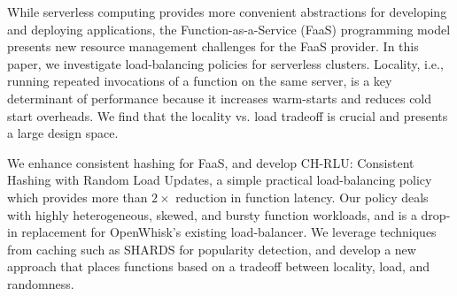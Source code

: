While serverless computing provides more convenient abstractions for developing and deploying applications, the Function-as-a-Service (FaaS) programming model presents new resource management challenges for the FaaS provider. 
In this paper, we investigate load-balancing policies for serverless clusters.
Locality, i.e., running repeated invocations of a function on the same server, is a key determinant of performance because it increases warm-starts and reduces cold start overheads. 
We find that the locality vs. load tradeoff is crucial and presents a large design space. 

We enhance consistent hashing for FaaS, and develop CH-RLU: Consistent Hashing with Random Load Updates, a simple practical load-balancing policy which provides more than $2\times$ reduction in function latency. 
Our policy deals with highly heterogeneous, skewed, and bursty function workloads, and is a drop-in replacement for OpenWhisk's existing load-balancer.
We leverage techniques from caching such as SHARDS for popularity detection, and develop a new approach that places functions based on a tradeoff between locality, load, and randomness. 





